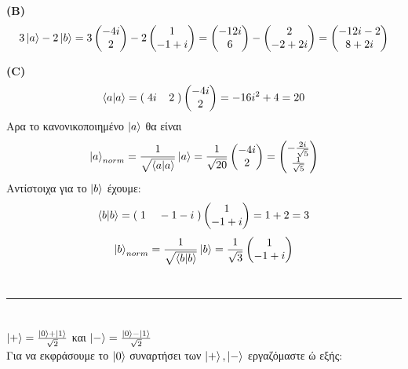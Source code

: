 \documentclass[12pt]{article}
\begin{document}
{\bf { (B)}} $$3\ket{a} - 2\ket{b} = 3\begin{pmatrix} -4i\\2 \end{pmatrix} - 2\begin{pmatrix} 1\\-1+i \end{pmatrix}=
\begin{pmatrix} -12i\\6 \end{pmatrix} - \begin{pmatrix} 2\\-2+2i \end{pmatrix}=\begin{pmatrix} -12i-2\\8+2i \end{pmatrix}$$
    
{\bf { (\textlatin{C})}} $$\braket{a|a} = (\; 4i \; \; \; \; 2\;)\begin{pmatrix} -4i\\2 \end{pmatrix} = -16 i^2 + 4 =20$$
Aρα το κανονικοποιημένο $\ket{a}$ θα είναι 
$$ \ket{a}_{norm}= \frac{1}{\sqrt{\braket{a|a}}}\ket{a}=\frac{1}{\sqrt{20}}\begin{pmatrix} -4i\\2 \end{pmatrix} = \begin{pmatrix} -\frac{2i}{\sqrt{5}}\\\frac{1}{\sqrt{5}} \end{pmatrix} $$
 Aντίστοιχα για το $\ket{b}$ έχουμε:
 $$\braket{b|b} = (\; 1 \; \; \; \; -1 -i\;)\begin{pmatrix} 1\\-1+i \end{pmatrix} = 1 + 2 =3$$ 
 $$ \ket{b}_{norm}= \frac{1}{\sqrt{\braket{b|b}}}\ket{b}=\frac{1}{\sqrt{3}}\begin{pmatrix} 1\\-1 + i \end{pmatrix} $$
 \\ \rule{\textwidth}{.5pt}
\section*{{}}
{\centering
$\ket{+} = \frac{\ket{0}+\ket{1}}{\sqrt{2}}$ και $\ket{-} = \frac{\ket{0}-\ket{1}}{\sqrt{2}}$\\
}
Για να εκφράσουμε το $\ket{0}$ συναρτήσει των $\ket{+},\ket{-}$ εργαζόμαστε ώ εξής:
\end{document}
